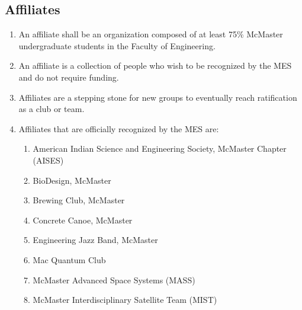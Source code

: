 \subsection{Affiliates}
\label{affiliates}
\begin{enumerate}
 \item
  An affiliate shall be an organization composed of at least 75\% McMaster undergraduate students in the Faculty of Engineering.
 \item
  An affiliate is a collection of people who wish to be recognized by the MES and do not require funding.
 \item
  Affiliates are a stepping stone for new groups to eventually reach ratification as a club or team.
 \item
  Affiliates that are officially recognized by the MES are:

  \begin{enumerate}
   \item
    American Indian Science and Engineering Society, McMaster Chapter (AISES)
   \item 
    BioDesign, McMaster
   \item
    Brewing Club, McMaster
   \item
    Concrete Canoe, McMaster
   \item
    Engineering Jazz Band, McMaster
   \item
    Mac Quantum Club
   \item 
    McMaster Advanced Space Systems (MASS)
   \item
    McMaster Interdisciplinary Satellite Team (MIST)
  \end{enumerate}
\end{enumerate}

